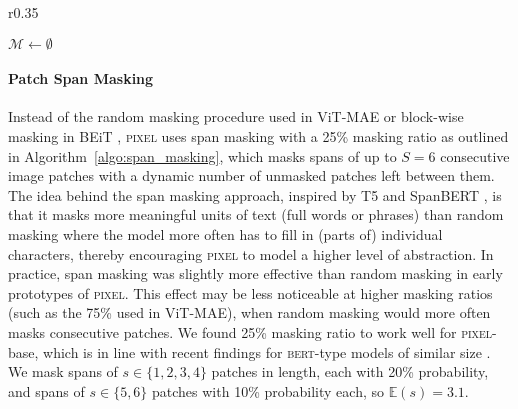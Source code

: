 \documentclass{article}
\newcommand{\model}{\textsc{pixel}\xspace}
\begin{document}
\begin{wrapfigure}{r}{0.35\textwidth}
    \vspace{-2.25em}
    \centering
    \begin{minipage}{\linewidth}
    \begin{algorithm}[H]
    \caption{\model Span Masking}\label{algo:span_masking}
    \begin{algorithmic}
        \scriptsize
        \State $\mathcal{M} \leftarrow \emptyset $
         
    \end{algorithmic}
    \end{algorithm}
    \end{minipage}
    \vspace{-1em}
\end{wrapfigure}

\vspace{-2mm}
\paragraph{Patch Span Masking} Instead of the random masking procedure used in ViT-MAE or block-wise masking in BEiT \citep{bao2022beit}, \model uses span masking with a 25\% masking ratio as outlined in Algorithm~\ref{algo:span_masking}, which masks spans of up to $S=6$ consecutive image patches with a dynamic number of unmasked patches left between them. The idea behind the span masking approach, inspired by T5 \citep{raffel-etal-2020-t5} and SpanBERT \citep{joshi-etal-2020-spanbert}, is that it masks more meaningful units of text (full words or phrases) than random masking where the model more often has to fill in (parts of) individual characters, thereby encouraging \model to model a higher level of abstraction.
In practice, span masking was slightly more effective than random masking in early prototypes of \model. 
This effect may be less noticeable at higher masking ratios (such as the 75\% used in ViT-MAE), when random masking would more often masks consecutive patches.
We found 25\% masking ratio to work well for \model-base, which is in line with recent findings for \textsc{bert}-type models of similar size \citep{wettig-etal-2022-mask}. 
We mask spans of $s \in \{1,2,3,4\}$ patches in length, each with 20\% probability, and spans of $s \in \{5,6\}$ patches with 10\% probability each, so $\mathbb{E}(s)=3.1$.
\end{document}
